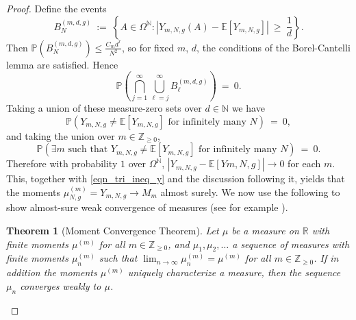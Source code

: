 \documentclass[11pt,reqno]{amsart}
\newcommand{\fix}[1]{\textcolor{red}{\textbf{ (#1)\normalsize}}}
\numberwithin{equation}{section}
\newtheorem{thm}{Theorem}[section]
\theoremstyle{plain}
\newcommand{\R}{\ensuremath{\mathbb{R}}}
\newcommand{\Z}{\ensuremath{\mathbb{Z}}}
\newcommand{\N}{\mathbb{N}}
\newcommand{\E}[1]{\mathbb{E}[#1]}
\begin{document}
\begin{proof}
Define the events
\begin{equation}
B_N^{(m,d,g)}\ := \ \left\{A \in \Omega^\N: |Y_{m,N,g}(A) - \E{Y_{m,N,g}}| \ \geq\ \frac{1}{d}\right\}.
\end{equation}
Then $\mathbb{P}(B_N^{(m,d,g)}) \leq \frac{C_m d^r}{N^2}$, so for fixed $m$, $d$, the conditions of the Borel-Cantelli lemma are satisfied. Hence
\begin{equation}
\mathbb{P}\left(\bigcap_{j=1}^\infty \bigcup_{\ell=j}^\infty B_\ell^{(m,d,g)}\right) \ =\ 0.
\end{equation}
Taking a union of these measure-zero sets over $d \in \N$ we have
\begin{equation}
\mathbb{P}\left(Y_{m,N,g} \neq \E{Y_{m,N,g}} \text{ for infinitely many $N$}\right)\ =\ 0,
\end{equation}
and taking the union over $m \in \Z_{\geq 0}$,
\begin{equation}
\mathbb{P}\left(\exists m \text{ such that }Y_{m,N,g} \neq \E{Y_{m,N,g}} \text{ for infinitely many $N$}\right)\ = \ 0.
\end{equation}
Therefore with probability $1$ over $\Omega^\N$, $|Y_{m,N,g}-\E{Y{m,N,g}}| \to 0$ for each $m$. This, together with \eqref{eqn_tri_ineq_y} and the discussion following it, yields that the moments $\mu_{N,g}^{(m)}=Y_{m,N,g} \to M_m$ almost surely. We now use the following to show almost-sure weak convergence of measures (see for example \cite{Ta}).

\begin{thm}[Moment Convergence Theorem]\label{thm_moment_convergence}
Let $\mu$ be a measure on $\R$ with finite moments $\mu^{(m)}$ for all $m \in \Z_{\geq 0}$, and $\mu_1,\mu_2,\ldots$ a sequence of measures with finite moments $\mu_n^{(m)}$ such that $\lim_{n\rightarrow \infty} \mu_n^{(m)} = \mu^{(m)}$ for all $m \in \Z_{\geq 0}$. If in addition the moments $\mu^{(m)}$ uniquely characterize a measure, then the sequence $\mu_n$ converges weakly to $\mu$.
\end{thm}



\end{proof}
\end{document}
